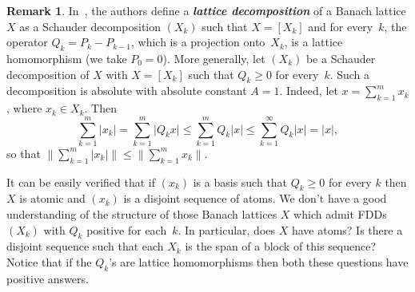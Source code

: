 \documentclass[12pt]{amsart}
\theoremstyle{plain}
\theoremstyle{definition}
\newtheorem{remark}[theorem]{Remark}
\newcommand{\abs}[1]{\lvert#1\rvert}
\newcommand{\bignorm}[1]{\bigl\lVert#1\bigr\rVert}
\newcommand{\term}[1]{{\textit{\textbf{#1}}}}   %
\renewcommand{\le}{\leqslant}
\renewcommand{\ge}{\geqslant}
\begin{document}
\begin{remark}
  In~\cite{Bu:90}, the authors define a \term{lattice decomposition}
  of a Banach lattice $X$ as a Schauder decomposition $(X_k)$ such
  that $X=[X_k]$ and for every~$k$, the operator $Q_k=P_k-P_{k-1}$,
  which is a projection onto~$X_k$, is a lattice homomorphism (we take
  $P_0=0$). More generally, let $(X_k)$ be a Schauder decomposition of
  $X$ with $X=[X_k]$ such that $Q_k\ge 0$ for every~$k$. Such a
  decomposition is absolute with absolute constant $A=1$. Indeed, let
  $x=\sum_{k=1}^mx_k$, where $x_k\in X_k$. Then
  \begin{displaymath}
    \sum_{k=1}^m\abs{x_k}=\sum_{k=1}^m\abs{Q_kx}
    \le\sum_{k=1}^mQ_k\abs{x}\le\sum_{k=1}^\infty Q_k\abs{x}
    =\abs{x},
  \end{displaymath}
  so that
  \begin{math}
    \bignorm{\sum_{k=1}^m\abs{x_k}}\le
    \bignorm{\sum_{k=1}^mx_k}.
  \end{math}

  It can be easily verified that if $(x_k)$ is a basis such that
  $Q_k\ge 0$ for every $k$ then $X$ is atomic and $(x_k)$ is a
  disjoint sequence of atoms.
  We don't have a good understanding of the structure of those Banach
  lattices $X$ which admit FDDs $(X_k)$ with $Q_k$ positive for each~$k$. In
  particular, does $X$ have atoms? Is there a disjoint sequence such
  that each $X_k$ is the span of a block of this sequence? Notice that
  if the $Q_k$'s are lattice homomorphisms then both these questions have
  positive answers.
\end{remark}

\end{document}
